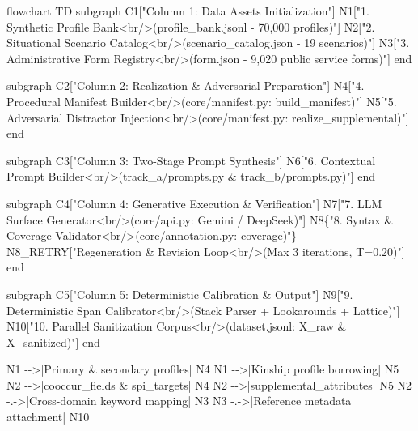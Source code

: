\documentclass[
  11pt,
  a4paper,
]{article}
\newenvironment{Shaded}{}{}
\newcommand{\NormalTok}[1]{#1}
\begin{document}
\begin{Shaded}
\begin{Highlighting}[]
\NormalTok{flowchart TD}
\NormalTok{    subgraph C1["Column 1: Data Assets Initialization"]}
\NormalTok{        N1["1. Synthetic Profile Bank\textless{}br/\textgreater{}(profile\_bank.jsonl {-} 70,000 profiles)"]}
\NormalTok{        N2["2. Situational Scenario Catalog\textless{}br/\textgreater{}(scenario\_catalog.json {-} 19 scenarios)"]}
\NormalTok{        N3["3. Administrative Form Registry\textless{}br/\textgreater{}(form.json {-} 9,020 public service forms)"]}
\NormalTok{    end}

\NormalTok{    subgraph C2["Column 2: Realization \& Adversarial Preparation"]}
\NormalTok{        N4["4. Procedural Manifest Builder\textless{}br/\textgreater{}(core/manifest.py: build\_manifest)"]}
\NormalTok{        N5["5. Adversarial Distractor Injection\textless{}br/\textgreater{}(core/manifest.py: realize\_supplemental)"]}
\NormalTok{    end}

\NormalTok{    subgraph C3["Column 3: Two{-}Stage Prompt Synthesis"]}
\NormalTok{        N6["6. Contextual Prompt Builder\textless{}br/\textgreater{}(track\_a/prompts.py \& track\_b/prompts.py)"]}
\NormalTok{    end}

\NormalTok{    subgraph C4["Column 4: Generative Execution \& Verification"]}
\NormalTok{        N7["7. LLM Surface Generator\textless{}br/\textgreater{}(core/api.py: Gemini / DeepSeek)"]}
\NormalTok{        N8\{"8. Syntax \& Coverage Validator\textless{}br/\textgreater{}(core/annotation.py: coverage)"\}}
\NormalTok{        N8\_RETRY["Regeneration \& Revision Loop\textless{}br/\textgreater{}(Max 3 iterations, T=0.20)"]}
\NormalTok{    end}

\NormalTok{    subgraph C5["Column 5: Deterministic Calibration \& Output"]}
\NormalTok{        N9["9. Deterministic Span Calibrator\textless{}br/\textgreater{}(Stack Parser + Lookarounds + Lattice)"]}
\NormalTok{        N10["10. Parallel Sanitization Corpus\textless{}br/\textgreater{}(dataset.jsonl: X\_raw \& X\_sanitized)"]}
\NormalTok{    end}

\NormalTok{    N1 {-}{-}\textgreater{}|Primary \& secondary profiles| N4}
\NormalTok{    N1 {-}{-}\textgreater{}|Kinship profile borrowing| N5}
\NormalTok{    N2 {-}{-}\textgreater{}|cooccur\_fields \& spi\_targets| N4}
\NormalTok{    N2 {-}{-}\textgreater{}|supplemental\_attributes| N5}
\NormalTok{    N2 {-}.{-}\textgreater{}|Cross{-}domain keyword mapping| N3}
\NormalTok{    N3 {-}.{-}\textgreater{}|Reference metadata attachment| N10}


\end{Highlighting}
\end{Shaded}
\end{document}

